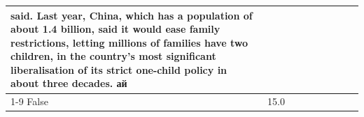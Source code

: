 \begin{table}[H]
\begin{tabular}{lllrlllll}
said. Last year, China, which has a population of about 1.4 billion, said it would ease family restrictions, letting millions of families have two children, in the country's most significant liberalisation of its strict one-child policy in about three decades. ай \\
\cline{1-9}
False & 15.0%
\end{tabular}
\end{table}
